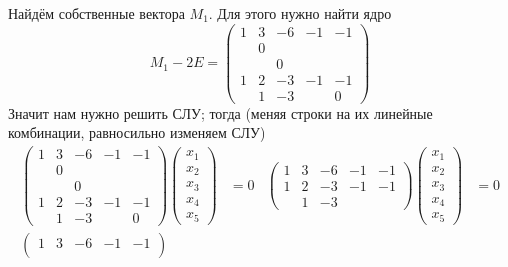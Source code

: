 \documentclass[12pt,a4paper]{article}
\begin{document}
\begin{problem*}
\begin{enumerate}
                Найдём собственные вектора $M_1$. Для этого нужно найти ядро
                \[
                    M_1 - 2E =
                    \begin{pmatrix}
                        1& 3& -6& -1& -1\\
                        & 0&&&\\
                        && 0&&\\
                        1& 2& -3& -1& -1\\
                        & 1& -3&&0
                    \end{pmatrix}
                \]
                Значит нам нужно решить СЛУ; тогда (меняя строки на их линейные комбинации, равносильно изменяем СЛУ)
                \begin{align*}
                    \begin{pmatrix}
                        1& 3& -6& -1& -1\\
                        & 0&&&\\
                        && 0&&\\
                        1& 2& -3& -1& -1\\
                        & 1& -3&&0
                    \end{pmatrix}
                    \begin{pmatrix}
                        x_1\\x_2\\x_3\\x_4\\x_5
                    \end{pmatrix}
                    &= 0&
                    \begin{pmatrix}
                        1& 3& -6& -1& -1\\
                        1& 2& -3& -1& -1\\
                        & 1& -3&&
                    \end{pmatrix}
                    \begin{pmatrix}
                        x_1\\x_2\\x_3\\x_4\\x_5
                    \end{pmatrix}
                    &= 0\\
                    \begin{pmatrix}
                        1& 3& -6& -1& -1\\

\end{pmatrix}
\end{align*}
\end{enumerate}
\end{problem*}
\end{document}
